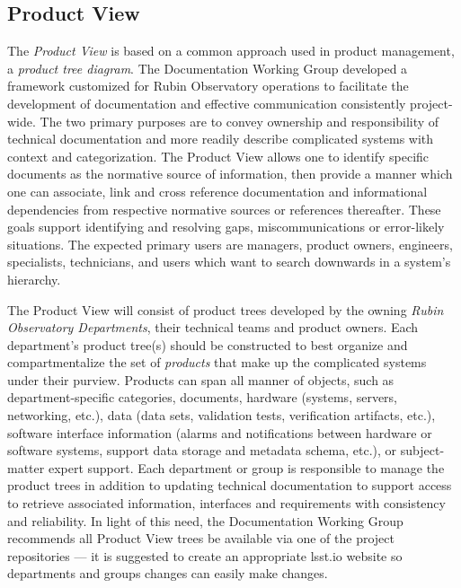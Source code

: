 \subsection{Product View}

The \emph{Product View} is based on a common approach used in product management, a \emph{product tree diagram}.
The Documentation Working Group developed a framework customized for Rubin Observatory operations to facilitate the development of documentation and effective communication consistently project-wide.
The two primary purposes are to convey ownership and responsibility of technical documentation and more readily describe complicated systems with context and categorization.
The Product View allows one to identify specific documents as the normative source of information, then provide a manner which one can associate, link and cross reference documentation and informational dependencies from respective normative sources or references thereafter.
These goals support identifying and resolving gaps, miscommunications or error-likely situations.
The expected primary users are managers, product owners, engineers, specialists, technicians, and users which want to search downwards in a system's hierarchy.

The Product View will consist of product trees developed by the owning \emph{Rubin Observatory Departments}, their technical teams and product owners.
Each department's product tree(s) should be constructed to best organize and compartmentalize the set of \emph{products} that make up the complicated systems under their purview.
Products can span all manner of objects, such as department-specific categories, documents, hardware (systems, servers, networking, etc.), data (data sets, validation tests, verification artifacts, etc.), software interface information (alarms and notifications between hardware or software systems, support data storage and metadata schema, etc.), or subject-matter expert support.
Each department or group is responsible to manage the product trees in addition to updating technical documentation to support access to retrieve associated information, interfaces and requirements with consistency and reliability.
In light of this need, the Documentation Working Group recommends all Product View trees be available via one of the project repositories --- it is suggested to create an appropriate lsst.io website so departments and groups changes can easily make changes.

